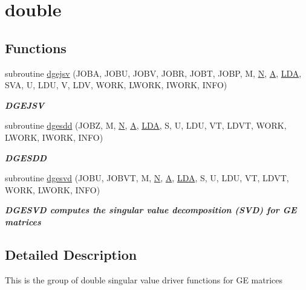 \hypertarget{group__doubleGEsing}{}\section{double}
\label{group__doubleGEsing}
\subsection*{Functions}
\begin{DoxyCompactItemize}
\item 
subroutine \hyperlink{group__doubleGEsing_ga8767bfcf983f8dc6ef2842029ab25599}{dgejsv} (J\+O\+B\+A, J\+O\+B\+U, J\+O\+B\+V, J\+O\+B\+R, J\+O\+B\+T, J\+O\+B\+P, M, \hyperlink{polmisc_8c_a0240ac851181b84ac374872dc5434ee4}{N}, \hyperlink{classA}{A}, \hyperlink{example__user_8c_ae946da542ce0db94dced19b2ecefd1aa}{L\+D\+A}, S\+V\+A, U, L\+D\+U, V, L\+D\+V, W\+O\+R\+K, L\+W\+O\+R\+K, I\+W\+O\+R\+K, I\+N\+F\+O)
\begin{DoxyCompactList}\small\item\em {\bfseries D\+G\+E\+J\+S\+V} \end{DoxyCompactList}\item 
subroutine \hyperlink{group__doubleGEsing_gad8e0f1c83a78d3d4858eaaa88a1c5ab1}{dgesdd} (J\+O\+B\+Z, M, \hyperlink{polmisc_8c_a0240ac851181b84ac374872dc5434ee4}{N}, \hyperlink{classA}{A}, \hyperlink{example__user_8c_ae946da542ce0db94dced19b2ecefd1aa}{L\+D\+A}, S, U, L\+D\+U, V\+T, L\+D\+V\+T, W\+O\+R\+K, L\+W\+O\+R\+K, I\+W\+O\+R\+K, I\+N\+F\+O)
\begin{DoxyCompactList}\small\item\em {\bfseries D\+G\+E\+S\+D\+D} \end{DoxyCompactList}\item 
subroutine \hyperlink{group__doubleGEsing_ga84fdf22a62b12ff364621e4713ce02f2}{dgesvd} (J\+O\+B\+U, J\+O\+B\+V\+T, M, \hyperlink{polmisc_8c_a0240ac851181b84ac374872dc5434ee4}{N}, \hyperlink{classA}{A}, \hyperlink{example__user_8c_ae946da542ce0db94dced19b2ecefd1aa}{L\+D\+A}, S, U, L\+D\+U, V\+T, L\+D\+V\+T, W\+O\+R\+K, L\+W\+O\+R\+K, I\+N\+F\+O)
\begin{DoxyCompactList}\small\item\em {\bfseries  D\+G\+E\+S\+V\+D computes the singular value decomposition (S\+V\+D) for G\+E matrices} \end{DoxyCompactList}\end{DoxyCompactItemize}


\subsection{Detailed Description}
This is the group of double singular value driver functions for G\+E matrices 

